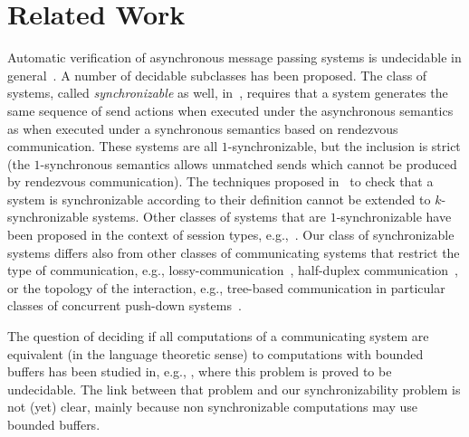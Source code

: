 \section{Related Work}\label{sec:related}

Automatic verification of asynchronous message passing systems is undecidable in general~\cite{DBLP:journals/jacm/BrandZ83}. 
A number of decidable subclasses has been proposed. 
The class of systems, called \emph{synchronizable} as well, in~\cite{DBLP:journals/tcs/BasuB16}, requires that a system generates the same sequence of send actions when executed under the asynchronous semantics as when executed under a synchronous semantics based on rendezvous communication. These systems are all $1$-synchronizable, but the inclusion is strict (the $1$-synchronous semantics allows unmatched sends which cannot be produced by rendezvous communication). The techniques proposed in~\cite{DBLP:journals/tcs/BasuB16} to check that a system is synchronizable according to their definition cannot be extended to $k$-synchronizable systems.
Other classes of systems that are $1$-synchronizable have been proposed in the context of session types, e.g.,~\cite{DBLP:conf/esop/DenielouY12,DBLP:journals/jacm/HondaYC16,DBLP:conf/esop/HondaVK98,DBLP:conf/popl/LangeTY15}. 
Our class of synchronizable systems differs also from other classes of communicating systems that restrict the type of communication, e.g., lossy-communication~\cite{DBLP:journals/iandc/AbdullaJ96}, half-duplex communication~\cite{DBLP:journals/iandc/CeceF05}, or the topology of the interaction, e.g., tree-based communication in particular classes of concurrent push-down systems~\cite{DBLP:conf/tacas/TorreMP08,DBLP:journals/corr/abs-1209-0359}.

The question of deciding if all computations of a communicating system are equivalent (in the language theoretic sense) to computations with bounded buffers has been studied in, e.g., \cite{DBLP:journals/fuin/GenestKM07}, where this problem is proved to be undecidable. The link between that problem and our synchronizability problem is not (yet) clear, mainly because non synchronizable computations may use bounded buffers.

